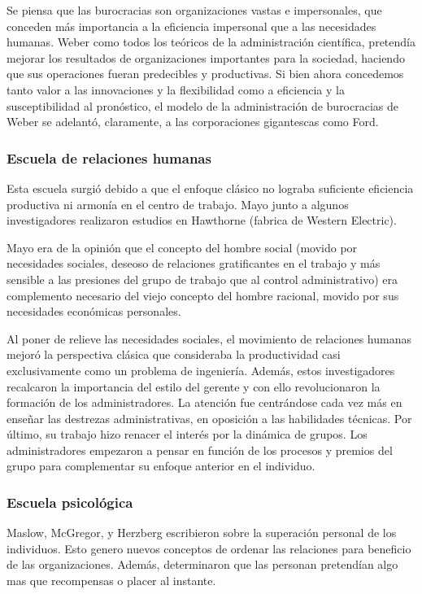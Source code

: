 \documentclass[titlepage,a4paper]{article}
\begin{document}
Se piensa que las burocracias son organizaciones vastas e impersonales, que conceden más importancia a la eficiencia impersonal que a las necesidades humanas. Weber como todos los teóricos de la administración científica, pretendía mejorar los resultados de organizaciones importantes para la sociedad, haciendo que sus operaciones fueran predecibles y productivas. Si bien ahora concedemos tanto valor a las innovaciones y la flexibilidad como a eficiencia y la susceptibilidad al pronóstico, el modelo de la administración de burocracias de Weber se adelantó, claramente, a las corporaciones gigantescas como Ford.

\subsubsection*{Escuela de relaciones humanas}
Esta escuela surgió debido a que el enfoque clásico no lograba suficiente eficiencia productiva ni armonía en el centro de trabajo. Mayo junto a algunos investigadores realizaron estudios en Hawthorne (fabrica de Western Electric).

Mayo era de la opinión que el concepto del hombre social (movido por necesidades sociales, deseoso de relaciones gratificantes en el trabajo y más sensible a las presiones del grupo de trabajo que al control administrativo) era complemento necesario del viejo concepto del hombre racional, movido por sus necesidades económicas personales. 

Al poner de relieve las necesidades sociales, el movimiento de relaciones humanas mejoró la perspectiva clásica que consideraba la productividad casi exclusivamente como un problema de ingeniería. Además, estos investigadores recalcaron la importancia del estilo del gerente y con ello revolucionaron la formación de los administradores. La atención fue centrándose cada vez más en enseñar las destrezas administrativas, en oposición a las habilidades técnicas. Por último, su trabajo hizo renacer el interés por la dinámica de grupos. Los administradores empezaron a pensar en función de los procesos y premios del grupo para complementar su enfoque anterior en el individuo.

\subsubsection*{Escuela psicológica}
Maslow, McGregor, y Herzberg escribieron sobre la superación personal de los individuos. Esto genero nuevos conceptos de ordenar las relaciones para beneficio de las organizaciones. Además, determinaron que las personan pretendían algo mas que recompensas o placer al instante.
\end{document}
